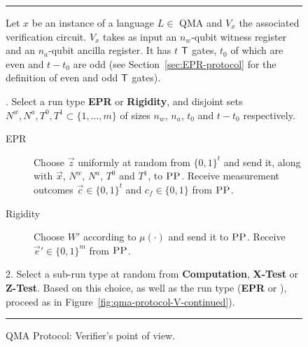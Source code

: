 \begin{figure}[H]
\rule[1ex]{\textwidth}{0.5pt}
\vspace{-20pt}
\justify
Let $x$ be an instance of a language $L \in$ QMA and $V_x$ the associated verification circuit. $V_x$ takes as input  an $n_w$-qubit witness register and an $n_a$-qubit ancilla register. It has $t$ $\sf T$ gates, $t_0$ of which are even and $t-t_0$ are odd (see Section~\ref{sec:EPR-protocol} for the definition of even and odd $\sf T$ gates).

. Select a run type \textbf{EPR} or \textbf{Rigidity}, and disjoint sets
  $N^w,N^a, T^0,T^1\subset \{1,\ldots,m\}$ of sizes $n_w$, $n_a$,  $t_0$ and $t-t_0$ respectively. 
\begin{description}
\item[EPR] Choose $\vec{z}$ uniformly at random from $\{0,1\}^t$ and send it,
  along with $\vec{x}$, $N^w$, $N^a$, $T^0$ and $T^1$, to $\textsc{PP}$. Receive measurement outcomes $\vec{c}\in\{0,1\}^t$ and $c_f\in\{0,1\}$ from $\textsc{PP}$.
\item[Rigidity] Choose $W'$ according to $\mu(\cdot)$ and send it to $\textsc{PP}$. Receive $\vec{e}'\in \{0,1\}^m$ from $\textsc{PP}$. 
\end{description}
2. Select a sub-run type at random from \textbf{Computation}, \textbf{X-Test} or \textbf{Z-Test}. Based on this choice, as well as the run type (\textbf{EPR} or ), proceed as in Figure~\ref{fig:qma-protocol-V-continued}).
\rule[2ex]{\textwidth}{0.5pt}\vspace{-.5cm}
\caption{QMA Protocol: Verifier's point of view.}\label{fig:qma-protocol-V}
\end{figure}


